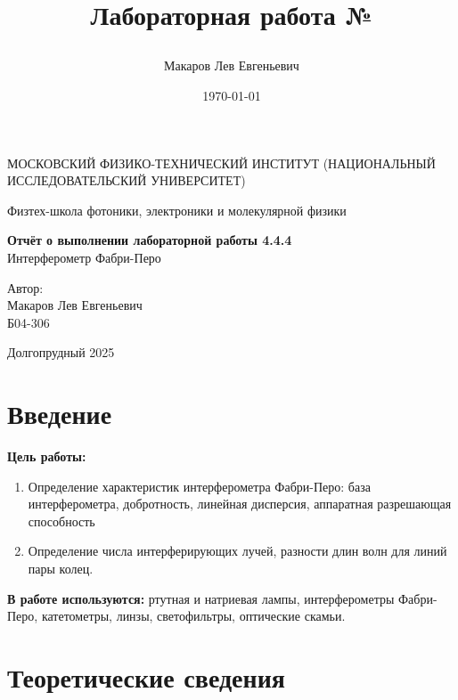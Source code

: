 \documentclass[a4paper,12pt]{article}
\author{Макаров Лев Евгеньевич}
\title{Лабораторная работа №\labnumber

\labname
}
\date{\today}
\newcommand\labname{Интерферометр Фабри-Перо}
\newcommand\labnumber{4.4.4}
\begin{document}
\begin{titlepage}
	\begin{center}
		{\large МОСКОВСКИЙ ФИЗИКО-ТЕХНИЧЕСКИЙ ИНСТИТУТ (НАЦИОНАЛЬНЫЙ ИССЛЕДОВАТЕЛЬСКИЙ УНИВЕРСИТЕТ)}
	\end{center}
	\begin{center}
		{\large Физтех-школа фотоники, электроники и молекулярной физики}
	\end{center}
	
	
	\vspace{4.5cm}
	{\huge
		\begin{center}
			{\bf Отчёт о выполнении лабораторной работы \labnumber}\\
			\labname
		\end{center}
	}
	\vspace{2cm}
	\begin{flushright}
		{\LARGE Автор:\\ Макаров Лев Евгеньевич \\
			\vspace{0.2cm}
			Б04-306}
	\end{flushright}
	\vspace{8cm}
	\begin{center}
		Долгопрудный 2025
	\end{center}
\end{titlepage}


\section{Введение}

\textbf{Цель работы:} 
\begin{enumerate}
	\item Определение характеристик интерферометра Фабри-Перо: база интерферометра, добротность, линейная дисперсия, аппаратная разрешающая способность
    \item Определение числа интерферирующих лучей, разности длин волн для линий пары колец.
\end{enumerate}

\textbf{В работе используются:} ртутная и натриевая лампы, интерферометры Фабри-Перо, катетометры, линзы, светофильтры, оптические скамьи.

\section{Теоретические сведения}
\end{document}
